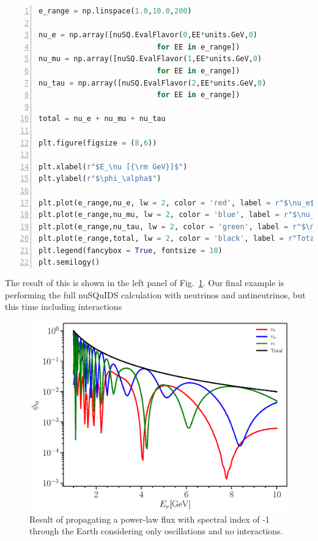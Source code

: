 \documentclass[3p,12pt]{elsarticle}
\begin{document}
\begin{lstlisting}[language=Python, frame=leftline, numbers=left, breaklines=true]
e_range = np.linspace(1.0,10.0,200)

nu_e = np.array([nuSQ.EvalFlavor(0,EE*units.GeV,0) 
                           for EE in e_range])
nu_mu = np.array([nuSQ.EvalFlavor(1,EE*units.GeV,0) 
                           for EE in e_range])
nu_tau = np.array([nuSQ.EvalFlavor(2,EE*units.GeV,0) 
                           for EE in e_range])

total = nu_e + nu_mu + nu_tau

plt.figure(figsize = (8,6))

plt.xlabel(r"$E_\nu [{\rm GeV}]$")
plt.ylabel(r"$\phi_\alpha$")

plt.plot(e_range,nu_e, lw = 2, color = 'red', label = r"$\nu_e$")
plt.plot(e_range,nu_mu, lw = 2, color = 'blue', label = r"$\nu_\mu$")
plt.plot(e_range,nu_tau, lw = 2, color = 'green', label = r"$\nu_\tau$")
plt.plot(e_range,total, lw = 2, color = 'black', label = r"Total")
plt.legend(fancybox = True, fontsize = 10)
plt.semilogy()
\end{lstlisting}
The result of this is shown in the left panel of Fig.~\ref{fig:nusquids_atm_python_no_interaction}. Our final example is 
performing the full nuSQuIDS calculation with neutrinos and antineutrinos, but this time including interactions

\begin{figure}[h!]
  \label{fig:nusquids_atm_python_no_interaction}
  \centering
  \includegraphics[width=\textwidth]{fig/nusquids_atm_python_no_int.eps}
  \caption{Result of propagating a power-law flux with spectral index of -1 through the Earth considering only oscillations and no interactions.}
\end{figure}
\end{document}
